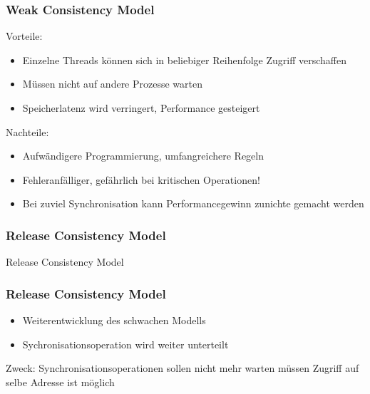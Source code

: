 \documentclass{sikslides}
\begin{document}
\begin{frame}
	\frametitle{Weak Consistency Model}
Vorteile:
	\begin{itemize}
		\item Einzelne Threads können sich in beliebiger Reihenfolge Zugriff verschaffen
		\item Müssen nicht auf andere Prozesse warten
		\item Speicherlatenz wird verringert, Performance gesteigert
	\end{itemize}
\bigskip
Nachteile:
	\begin{itemize}
		\item Aufwändigere Programmierung, umfangreichere Regeln
		\item Fehleranfälliger, gefährlich bei kritischen Operationen!
		\item Bei zuviel Synchronisation kann Performancegewinn zunichte gemacht werden
	\end{itemize}
\end{frame}


\begin{frame}
	\frametitle{Release Consistency Model}
Release Consistency Model
\end{frame}

\begin{frame}
	\frametitle{Release Consistency Model}
	\begin{itemize}
		\item Weiterentwicklung des schwachen Modells
		\item Sychronisationsoperation wird weiter unterteilt
	\end{itemize}
	\bigskip Zweck: 
\newline Synchronisationsoperationen sollen nicht mehr warten müssen 
\newline Zugriff auf selbe Adresse ist möglich
\end{frame}
\end{document}
